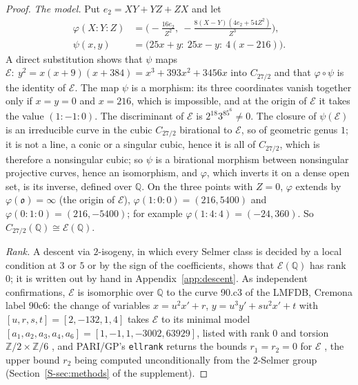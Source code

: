 \documentclass[pdflatex,sn-mathphys-num]{sn-jnl}
\theoremstyle{thmstyleone}%
\theoremstyle{thmstylethree}%
\newcommand{\Q}{\mathbb{Q}}
\newcommand{\sref}[1]{\ref*{S-#1}}%
\begin{document}
\begin{proof}
\emph{The model.} Put $e_2=XY+YZ+ZX$ and let
\begin{align*}
  \varphi(X:Y:Z)&=\Big(-\frac{16e_2}{Z^2},\ -\frac{8(X-Y)(4e_2+54Z^2)}{Z^3}\Big),\\
  \psi(x,y)&=\big(25x+y:\ 25x-y:\ 4(x-216)\big).
\end{align*}
A direct substitution shows that $\psi$ maps $\mathcal E:\ y^2=x(x+9)(x+384)=x^3+393x^2+3456x$ into $C_{27/2}$ and that $\varphi\circ\psi$ is the identity of $\mathcal E$. The map $\psi$ is a morphism: its three coordinates vanish together only if $x=y=0$ and $x=216$, which is impossible, and at the origin of $\mathcal E$ it takes the value $(1:-1:0)$. The discriminant of $\mathcal E$ is $2^{18}3^85^6\ne0$. The closure of $\psi(\mathcal E)$ is an irreducible curve in the cubic $C_{27/2}$ birational to $\mathcal E$, so of geometric genus $1$; it is not a line, a conic or a singular cubic, hence it is all of $C_{27/2}$, which is therefore a nonsingular cubic; so $\psi$ is a birational morphism between nonsingular projective curves, hence an isomorphism, and $\varphi$, which inverts it on a dense open set, is its inverse, defined over $\Q$. On the three points with $Z=0$, $\varphi$ extends by $\varphi(\mathfrak o)=\infty$ (the origin of $\mathcal E$), $\varphi(1:0:0)=(216,5400)$ and $\varphi(0:1:0)=(216,-5400)$; for example $\varphi(1:4:4)=(-24,360)$. So $C_{27/2}(\Q)\cong \mathcal E(\Q)$.

\emph{Rank.} A descent via $2$-isogeny, in which every Selmer class is decided by a local condition at $3$ or $5$ or by the sign of the coefficients, shows that $\mathcal E(\Q)$ has rank $0$; it is written out by hand in Appendix~\ref{app:descent}. As independent confirmations, $\mathcal E$ is isomorphic over $\Q$ to the curve 90.c3 of the LMFDB, Cremona label 90c6: the change of variables $x=u^2x'+r$, $y=u^3y'+su^2x'+t$ with $[u,r,s,t]=[2,-132,1,4]$ takes $\mathcal E$ to its minimal model $[a_1,a_2,a_3,a_4,a_6]=[1,-1,1,-3002,63929]$, listed with rank $0$ and torsion $\mathbb Z/2\times\mathbb Z/6$ \cite{lmfdb90c3}, and PARI/GP's \texttt{ellrank} returns the bounds $r_1=r_2=0$ for $\mathcal E$ \cite{pari2172}, the upper bound $r_2$ being computed unconditionally from the $2$-Selmer group (Section~\sref{sec:methods} of the supplement).


\end{proof}
\end{document}
